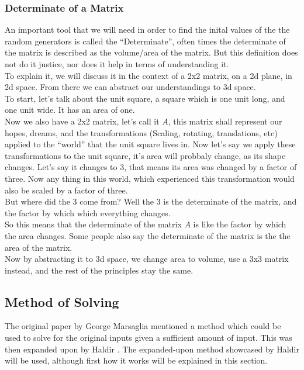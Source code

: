 \documentclass[12pft, english]{article}
\begin{document}
\begin{multicols}{2}
  \subsubsection{Determinate of a Matrix}
  An important tool that we will need in order to find the inital values of the the random generators is called the ``Determinate'', often times the determinate of the matrix is described as the volume/area of the matrix. But this definition does not do it justice, nor does it help in terms of understanding it. \\
  To explain it, we will discuss it in the context of a 2x2 matrix, on a 2d plane, in 2d space. From there we can abstract our understandings to 3d space. \\
  To start, let's talk about the unit square, a square which is one unit long, and one unit wide. It has an area of one. \\
  Now we also have a 2x2 matrix, let's call it \(A\), this matrix shall represent our hopes, dreams, and the transformations (Scaling, rotating, translations, etc) applied to the ``world'' that the unit square lives in. Now let's say we apply these transformations to the unit square, it's area will probbaly change, as its shape changes. Let's say it changes to 3, that means its area was changed by a factor of three. Now any thing in this world, which experienced this transformation would also be scaled by a factor of three. \\
  But where did the 3 come from? Well the 3 is the determinate of the matrix, and the factor by which which everything changes.  \\
  So this means that the determinate of the matrix \(A\) is like the factor by which the area changes. Some people also say the determinate of the matrix is the the area of the matrix. \\
  Now by abstracting it to 3d space, we change area to volume, use a 3x3 matrix instead, and the rest of the principles stay the same.

  \subsection{Method of Solving }
  The original paper by George Marsaglia \citep{fallOntoPlanes} mentioned a method which could be used to solve for the original inputs given a sufficient amount of input. This was then expanded upon by Haldir \citep{reteamHal}. The expanded-upon method showcased by Haldir will be used, although first how it works will be explained in this section.

\end{multicols}
\end{document}
